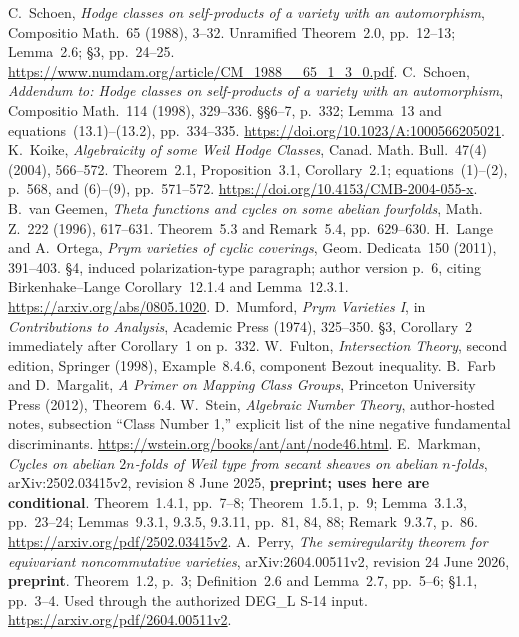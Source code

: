  C.~Schoen, \emph{Hodge classes on self-products of a variety with an automorphism}, Compositio Math.~65 (1988), 3--32. Unramified Theorem~2.0, pp.~12--13; Lemma~2.6; \S3, pp.~24--25. \url{https://www.numdam.org/article/CM_1988__65_1_3_0.pdf}.
 C.~Schoen, \emph{Addendum to: Hodge classes on self-products of a variety with an automorphism}, Compositio Math.~114 (1998), 329--336. \S\S6--7, p.~332; Lemma~13 and equations~(13.1)--(13.2), pp.~334--335. \url{https://doi.org/10.1023/A:1000566205021}.
 K.~Koike, \emph{Algebraicity of some Weil Hodge Classes}, Canad. Math. Bull.~47(4) (2004), 566--572. Theorem~2.1, Proposition~3.1, Corollary~2.1; equations~(1)--(2), p.~568, and (6)--(9), pp.~571--572. \url{https://doi.org/10.4153/CMB-2004-055-x}.
 B.~van Geemen, \emph{Theta functions and cycles on some abelian fourfolds}, Math. Z.~222 (1996), 617--631. Theorem~5.3 and Remark~5.4, pp.~629--630.
 H.~Lange and A.~Ortega, \emph{Prym varieties of cyclic coverings}, Geom. Dedicata~150 (2011), 391--403. \S4, induced polarization-type paragraph; author version p.~6, citing Birkenhake--Lange Corollary~12.1.4 and Lemma~12.3.1. \url{https://arxiv.org/abs/0805.1020}.
 D.~Mumford, \emph{Prym Varieties I}, in \emph{Contributions to Analysis}, Academic Press (1974), 325--350. \S3, Corollary~2 immediately after Corollary~1 on p.~332.
 W.~Fulton, \emph{Intersection Theory}, second edition, Springer (1998), Example~8.4.6, component Bezout inequality.
 B.~Farb and D.~Margalit, \emph{A Primer on Mapping Class Groups}, Princeton University Press (2012), Theorem~6.4.
 W.~Stein, \emph{Algebraic Number Theory}, author-hosted notes, subsection ``Class Number 1,'' explicit list of the nine negative fundamental discriminants. \url{https://wstein.org/books/ant/ant/node46.html}.
 E.~Markman, \emph{Cycles on abelian $2n$-folds of Weil type from secant sheaves on abelian $n$-folds}, arXiv:2502.03415v2, revision 8 June 2025, \textbf{preprint; uses here are conditional}. Theorem~1.4.1, pp.~7--8; Theorem~1.5.1, p.~9; Lemma~3.1.3, pp.~23--24; Lemmas~9.3.1, 9.3.5, 9.3.11, pp.~81, 84, 88; Remark~9.3.7, p.~86. \url{https://arxiv.org/pdf/2502.03415v2}.
 A.~Perry, \emph{The semiregularity theorem for equivariant noncommutative varieties}, arXiv:2604.00511v2, revision 24 June 2026, \textbf{preprint}. Theorem~1.2, p.~3; Definition~2.6 and Lemma~2.7, pp.~5--6; \S1.1, pp.~3--4. Used through the authorized DEG\_L S-14 input. \url{https://arxiv.org/pdf/2604.00511v2}.
